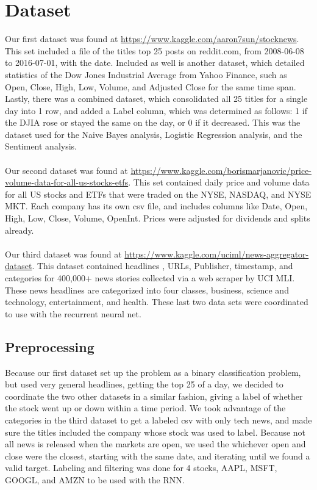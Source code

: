 \documentclass{article}
\begin{document}
\section{Dataset}
Our first dataset was found at \url{https://www.kaggle.com/aaron7sun/stocknews}. This set included a file of the
 titles top 25 posts on reddit.com, from 2008-06-08 to 2016-07-01, with the date. Included as well is another
 dataset, which detailed statistics of the Dow Jones Industrial Average from Yahoo Finance, such as Open,
 Close, High, Low, Volume, and Adjusted Close for the same time span. Lastly, there was a combined dataset,
 which consolidated all 25 titles for a single day into 1 row, and added a Label column, which was determined
 as follows: 1 if the DJIA rose or stayed the same on the day, or 0 if it decreased. This was the dataset used
 for the Naive Bayes analysis, Logistic Regression analysis, and the Sentiment analysis. 
\\\\
Our second dataset was found at \url{https://www.kaggle.com/borismarjanovic/price-volume-data-for-all-us-stocks-etfs}.
 This set contained daily price and volume data for all US stocks and ETFs that were traded on the NYSE, NASDAQ,
 and NYSE MKT. Each company has its own csv file, and includes columns like Date, Open, High, Low, Close, Volume,
 OpenInt. Prices were adjusted for dividends and splits already. 
\\\\
Our third dataset was found at \url{https://www.kaggle.com/uciml/news-aggregator-dataset}. This dataset contained headlines
, URLs, Publisher, timestamp, and categories for 400,000+ news stories collected via a web scraper by UCI MLI. These news
 headlines are categorized into four classes, business, science and technology, entertainment, and health. These last two
 data sets were coordinated to use with the recurrent neural net.
\subsection{Preprocessing}
Because our first dataset set up the problem as a binary classification problem, but used very general headlines, getting
 the top 25 of a day, we decided to coordinate the two other datasets in a similar fashion, giving a label of whether the
 stock went up or down within a time period. We took advantage of the categories in the third dataset to get a labeled csv
 with only tech news, and made sure the titles included the company whose stock was used to label. Because not all news is
 released when the markets are open, we used the whichever open and close were the closest, starting with the same date,
 and iterating until we found a valid target. Labeling and filtering was done for 4 stocks,  AAPL, MSFT, GOOGL, and AMZN
 to be used with the RNN.
\end{document}
